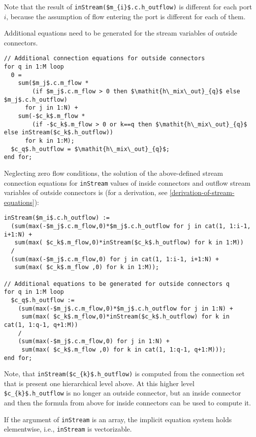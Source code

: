 Note that the result of \lstinline!inStream($m_{i}$.c.h_outflow)! is different for each port $i$, because the assumption of flow entering the port is different for each of them.

Additional equations need to be generated for the stream variables of outside connectors.

\begin{lstlisting}[language=modelica]
// Additional connection equations for outside connectors
for q in 1:M loop
  0 =
    sum($m_j$.c.m_flow *
        (if $m_j$.c.m_flow > 0 then $\mathit{h\_mix\_out}_{q}$ else $m_j$.c.h_outflow)
      for j in 1:N) +
    sum(-$c_k$.m_flow *
        (if -$c_k$.m_flow > 0 or k==q then $\mathit{h\_mix\_out}_{q}$ else inStream($c_k$.h_outflow))
      for k in 1:M);
  $c_q$.h_outflow = $\mathit{h\_mix\_out}_{q}$;
end for;
\end{lstlisting}

Neglecting zero flow conditions, the solution of the above-defined stream connection equations for \lstinline!inStream! values of inside connectors and outflow stream variables of outside connectors is (for a derivation, see
\cref{derivation-of-stream-equations}):
\begin{lstlisting}[language=modelica]
inStream($m_i$.c.h_outflow) :=
  (sum(max(-$m_j$.c.m_flow,0)*$m_j$.c.h_outflow for j in cat(1, 1:i-1, i+1:N) +
   sum(max( $c_k$.m_flow,0)*inStream($c_k$.h_outflow) for k in 1:M))
  /
  (sum(max(-$m_j$.c.m_flow,0) for j in cat(1, 1:i-1, i+1:N) +
   sum(max( $c_k$.m_flow ,0) for k in 1:M));

// Additional equations to be generated for outside connectors q
for q in 1:M loop
  $c_q$.h_outflow :=
    (sum(max(-$m_j$.c.m_flow,0)*$m_j$.c.h_outflow for j in 1:N) +
     sum(max( $c_k$.m_flow,0)*inStream($c_k$.h_outflow) for k in cat(1, 1:q-1, q+1:M))
    /
    (sum(max(-$m_j$.c.m_flow,0) for j in 1:N) +
     sum(max( $c_k$.m_flow ,0) for k in cat(1, 1:q-1, q+1:M)));
end for;
\end{lstlisting}

\begin{nonnormative}
Note, that \lstinline!inStream($c_{k}$.h_outflow)! is computed from the connection set that is present one hierarchical level above.
At this higher level \lstinline!$c_{k}$.h_outflow! is no longer an outside connector, but an inside connector and then the formula from above for inside connectors can be used to compute it.
\end{nonnormative}

If the argument of \lstinline!inStream! is an array, the implicit equation system holds elementwise, i.e., \lstinline!inStream! is vectorizable.

